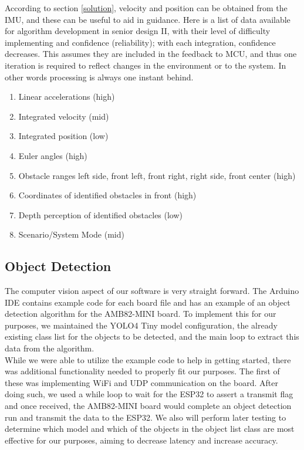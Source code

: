 \noindent According to section \ref{solution}, velocity and position can be obtained from the IMU, and these can be useful to aid in guidance. Here is a list of data available for algorithm development in senior design II, with their level of difficulty implementing and confidence (reliability); with each integration, confidence decreases. This assumes they are included in the feedback to MCU, and thus one iteration is required to reflect changes in the environment or to the system. In other words processing is always one instant behind.
\begin{enumerate}[itemsep=0mm]
	\item Linear accelerations (high)
	\item Integrated velocity (mid)
	\item Integrated position (low)
	\item Euler angles (high)
	\item Obstacle ranges left side, front left, front right, right side, front center (high)
	\item Coordinates of identified obstacles in front (high)
	\item Depth perception of identified obstacles (low)
	\item Scenario/System Mode (mid)
\end{enumerate}

\subsection{Object Detection}
\noindent The computer vision aspect of our software is very straight forward. The Arduino IDE contains example code for each board file and has an example of an object detection algorithm for the AMB82-MINI board. To implement this for our purposes, we maintained the YOLO4 Tiny model configuration, the already existing class list for the objects to be detected, and the main loop to extract this data from the algorithm. \\

\noindent While we were able to utilize the example code to help in getting started, there was additional functionality needed to properly fit our purposes. The first of these was implementing WiFi and UDP communication on the board. After doing such, we used a while loop to wait for the ESP32 to assert a transmit flag and once received, the AMB82-MINI board would complete an object detection run and transmit the data to the ESP32. We also will perform later testing to determine which model and which of the objects in the object list class are most effective for our purposes, aiming to decrease latency and increase accuracy.

